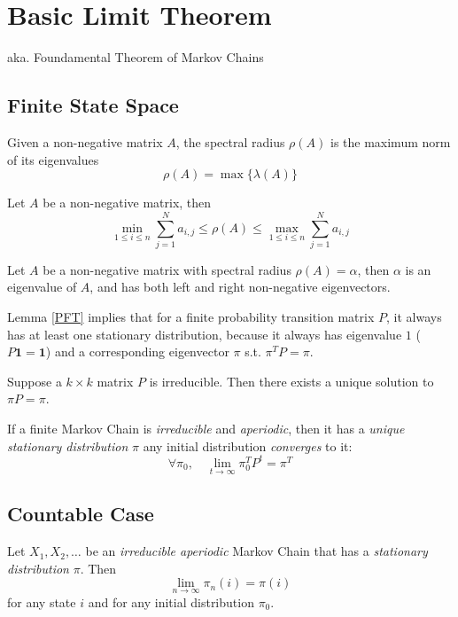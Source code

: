 \section{Basic Limit Theorem}\label{BasicLimitTheorem}
aka. Foundamental Theorem of Markov Chains

\subsection{Finite State Space}
\begin{definition}
    Given a non-negative matrix $A$, the spectral radius $\rho(A)$ is the maximum norm of its eigenvalues
    \[ \rho(A) = \max\{ \lambda(A) \} \]
\end{definition}
\begin{proposition}
    Let $A$ be a non-negative matrix, then
    \[ \min_{1\le i \le n} \sum_{j=1}^N a_{i,j} \le \rho(A) \le \max_{1\le i \le n} \sum_{j=1}^N a_{i,j} \]
\end{proposition}

\begin{lemma}\label{PFT}
    Let $A$ be a non-negative matrix with spectral radius $\rho(A) = \alpha$, then $\alpha$ is an eigenvalue of $A$, and has both left and right non-negative eigenvectors.
\end{lemma}
\begin{remark}
    Lemma \ref{PFT} implies that for a finite probability transition matrix $P$, it always has at least one stationary distribution, because it always has eigenvalue $1$ ($P\mathbf{1} = \mathbf{1}$) and a corresponding eigenvector $\pi$ s.t. $\pi^TP = \pi$.
\end{remark}

\begin{lemma}
    Suppose a $k \times k$ matrix $P$ is irreducible. Then there exists a unique solution to $\pi P = \pi$.
\end{lemma}

\begin{theorem} If a finite Markov Chain is \emph{irreducible} and \emph{aperiodic}, then it has a \emph{unique stationary distribution} $\pi$ any initial distribution \emph{converges} to it:
    \[ \forall \pi_0,\quad \lim_{t\to\infty}\pi_0^T P^t = \pi^T \]
\end{theorem}

\subsection{Countable Case}
\begin{theorem}
    Let $X_1, X_2, \dots$ be an \emph{irreducible aperiodic} Markov Chain that has a \emph{stationary distribution} $\pi$. Then
    \[ \lim_{n\to\infty}\pi_n(i) = \pi(i) \]
    for any state $i$ and for any initial distribution $\pi_0$.
\end{theorem}


